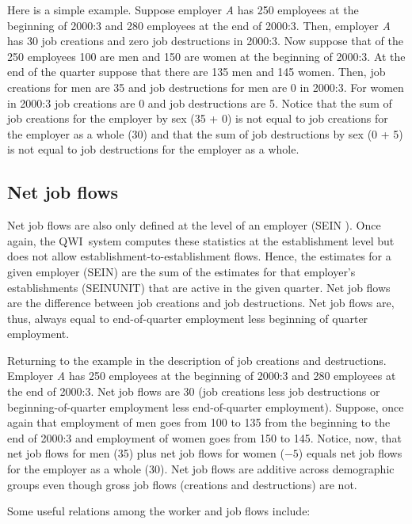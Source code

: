 Here is a simple example. Suppose employer \textit{A} has 250 employees at
the beginning of 2000:3 and 280 employees at the end of 2000:3. Then,
employer \textit{A} has 30 job creations and zero job destructions in
2000:3. Now suppose that of the 250 employees 100 are men and 150 are women
at the beginning of 2000:3. At the end of the quarter suppose that there are
135 men and 145 women. Then, job creations for men are 35 and job
destructions for men are 0 in 2000:3. For women in 2000:3 job creations are
0 and job destructions are 5. Notice that the sum of job creations for the
employer by sex (35 + 0) is not equal to job creations for the employer as a
whole (30) and that the sum of job destructions by sex (0 + 5) is not equal
to job destructions for the employer as a whole.

\subsection{Net job flows}


Net job flows are also only defined at the level of an employer (SEIN%
). Once again, the QWI\ system computes these statistics at the
establishment level but does not allow establishment-to-establishment flows.
Hence, the estimates for a given employer (SEIN) are the sum of the
estimates for that employer's establishments (SEINUNIT) that are active in
the given quarter. Net job flows are the difference between job creations
and job destructions. Net job flows are, thus, always equal to
end-of-quarter employment less beginning of quarter employment.

Returning to the example in the description of job creations and
destructions. Employer \textit{A} has 250 employees at the beginning of
2000:3 and 280 employees at the end of 2000:3. Net job flows are 30 (job
creations less job destructions or beginning-of-quarter employment less
end-of-quarter employment). Suppose, once again that employment of men goes
from 100 to 135 from the beginning to the end of 2000:3 and employment of
women goes from 150 to 145. Notice, now, that net job flows for men (35)
plus net job flows for women ($-5$) equals net job flows for the employer as
a whole (30). Net job flows are additive across demographic groups even
though gross job flows (creations and destructions) are not.

Some useful relations among the worker and job flows include:

